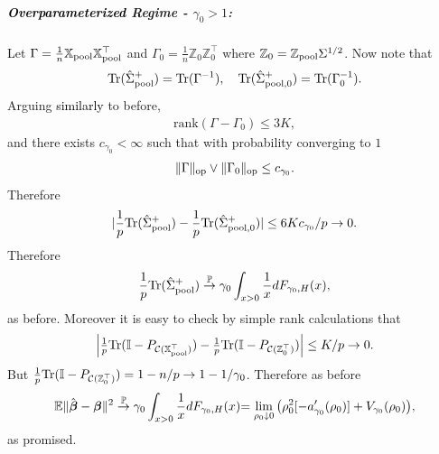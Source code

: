\documentclass{article}
\theoremstyle{plain}
\theoremstyle{remark}
\def \bbeta{\boldsymbol{\beta}}
\def \bbeta{\boldsymbol{\beta}}
\def \Xm {\mathbb{X}_{\rm pool}}
\def \tr {\mathrm{Tr}}
\def \I{\mathcal{I}}
\def \E{\mathbb{E}}
\def \P{\mathbb{P}}
\def \I {\mathbb{I}}
\begin{document}
\subparagraph{\textcolor{black}{Overparameterized} Regime - $\gamma_0>1$:} Let $\Gamma=\frac{1}{n}\Xm\Xm^\top$ and $\Gamma_0=\frac{1}{n}\mathbb{Z}_0\mathbb{Z}_0^\top$ where $\mathbb{Z}_0=\mathbb{Z}_{\rm pool}\Sigma^{1/2}$. Now note that
\begin{align*}
    \tr(\hat{\Sigma}^+_{\rm pool})=\tr(\Gamma^{-1}),\quad  \tr(\hat{\Sigma}^+_{\rm pool,0})=\tr(\Gamma_0^{-1}).
\end{align*}
Arguing \textcolor{black}{similarly} to before,
\begin{align*}
    \mathrm{rank}(\Gamma-\Gamma_0)\leq 3K,
\end{align*}
and there exists $c_{\gamma_0}<\infty$ such that with probability converging to $1$
\begin{align*}
    \|\Gamma\|_{\rm op}\vee \|\Gamma_0\|_{\rm op}\leq c_{\gamma_0}.
\end{align*}
Therefore
\begin{align*}
    |\frac{1}{p}\tr (\hat{\Sigma}_{\rm pool}^+)-\frac{1}{p}\tr (\hat{\Sigma}_{\rm pool,0}^+)|\leq 6Kc_{\gamma_0}/p\to 0.
\end{align*}
Therefore
\begin{align*}
    \frac{1}{p}\tr (\hat{\Sigma}_{\rm pool}^+)\stackrel{\P}{\to}\gamma_0\int_{x>0}\frac{1}{x}dF_{\gamma_0,H}(x),
\end{align*}
as before. Moreover it is easy to check by simple rank calculations that
\begin{align*}
    \left|\tfrac{1}{p}\tr(\I-P_{\mathcal{C}(\textcolor{black}{\Xm^\top})})-\tfrac{1}{p}\tr(\I-P_{\mathcal{C}(\textcolor{black}{\mathbb{Z}_0^\top})})\right|\leq K/p\to 0.
\end{align*}
But $\frac{1}{p}\tr(\I-P_{\mathcal{C}(\textcolor{black}{\mathbb{Z}_0^\top})})=1-n/p\to 1-1/\gamma_0$. Therefore as before
\begin{align*}
    \E\|\hat{\bbeta}-\bbeta\|^2 \stackrel{\P}{\to} \gamma_0\int_{x>0}\frac{1}{x}dF_{\gamma_0,H}(x)\textcolor{black}{=\lim_{\rho_0\downarrow 0}\left(\rho_0^2[-a_{\gamma_0}'(\rho_0)]
    +
    V_{\gamma_0}(\rho_0)\right)},
\end{align*}
as promised.
\end{document}
